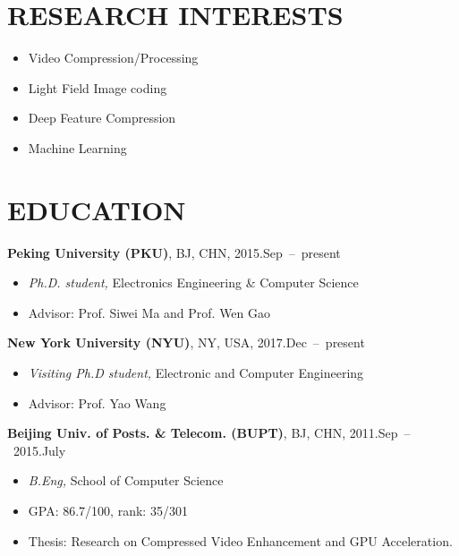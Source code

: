 \documentclass[margin, 10pt]{res} %
\begin{document}
\begin{resume}


\section{RESEARCH INTERESTS}

\begin{itemize} \itemsep -2pt %
\item{Video Compression/Processing}
\item{Light Field Image coding}
\item{Deep Feature Compression}
\item{Machine Learning}
\end{itemize}


\section{EDUCATION}
{\bf Peking University (PKU)}, BJ, CHN, \hfill{ 2015.Sep~--~present}
\begin{itemize} \itemsep -1pt
\item{{\sl Ph.D. student,} Electronics Engineering \& Computer Science}
\item{Advisor: Prof. Siwei Ma and Prof. Wen Gao}
\end{itemize}
{\bf New York University (NYU)}, NY, USA, \hfill{ 2017.Dec~--~present}
\begin{itemize} \itemsep -1pt
\item{{\sl Visiting Ph.D student,} Electronic and Computer Engineering}
\item{Advisor: Prof. Yao Wang}
\end{itemize}
{\bf Beijing Univ. of Posts. \& Telecom. (BUPT)}, BJ, CHN, \hfill{ 2011.Sep~--~2015.July}
\begin{itemize} \itemsep -1pt
\item{{\sl B.Eng,} School of Computer Science}
\item{GPA: 86.7/100, rank: 35/301}
\item{Thesis: Research on Compressed Video Enhancement and GPU Acceleration.}
\end{itemize}



\end{resume}
\end{document}
